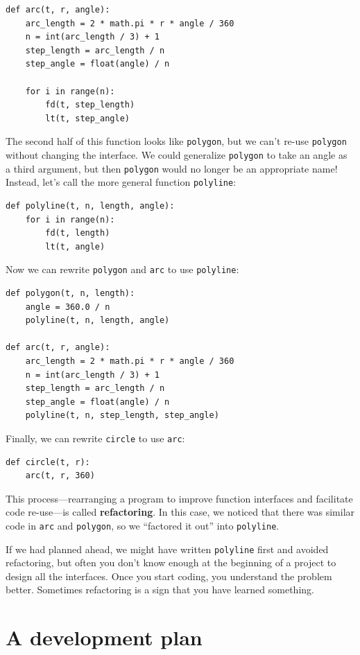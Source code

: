 \documentclass[10pt]{book}
\begin{document}
\begin{CJK}{UTF8}{gbsn}
\begin{verbatim}
def arc(t, r, angle):
    arc_length = 2 * math.pi * r * angle / 360
    n = int(arc_length / 3) + 1
    step_length = arc_length / n
    step_angle = float(angle) / n
    
    for i in range(n):
        fd(t, step_length)
        lt(t, step_angle)
\end{verbatim}
%
The second half of this function looks like {\tt polygon}, but we
can't re-use {\tt polygon} without changing the interface.  We could
generalize {\tt polygon} to take an angle as a third argument,
but then {\tt polygon} would no longer be an appropriate name!
Instead, let's call the more general function {\tt polyline}:

\begin{verbatim}
def polyline(t, n, length, angle):
    for i in range(n):
        fd(t, length)
        lt(t, angle)
\end{verbatim}
%
Now we can rewrite {\tt polygon} and {\tt arc} to use {\tt polyline}:

\begin{verbatim}
def polygon(t, n, length):
    angle = 360.0 / n
    polyline(t, n, length, angle)

def arc(t, r, angle):
    arc_length = 2 * math.pi * r * angle / 360
    n = int(arc_length / 3) + 1
    step_length = arc_length / n
    step_angle = float(angle) / n
    polyline(t, n, step_length, step_angle)
\end{verbatim}
%
Finally, we can rewrite {\tt circle} to use {\tt arc}:

\begin{verbatim}
def circle(t, r):
    arc(t, r, 360)
\end{verbatim}
%
This process---rearranging a program to improve function
interfaces and facilitate code re-use---is called {\bf refactoring}.
In this case, we noticed that there was similar code in {\tt arc} and
{\tt polygon}, so we ``factored it out'' into {\tt polyline}.

If we had planned ahead, we might have written {\tt polyline} first
and avoided refactoring, but often you don't know enough at the
beginning of a project to design all the interfaces.  Once you start
coding, you understand the problem better.  Sometimes refactoring is a
sign that you have learned something.


\section{A development plan}


\end{CJK}
\end{document}
